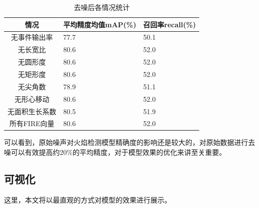 \begin{table}[ht]
    \centering
    \caption{去噪后各情况统计}
    \begin{tabularx}{0.7\textwidth}{c|X|X}
        \toprule
        情况&平均精度均值mAP(\%)&召回率recall(\%)\\
        \midrule
        无事件输出率&77.7&50.1\\
        无长宽比&80.6&52.0\\
        无圆形度&80.6&52.0\\
        无矩形度&80.6&52.0\\
        无尖角数&78.9&51.1\\
        无形心移动&80.6&52.0\\
        无面积生长系数&80.5&51.9\\
        所有FIRE向量&80.6&52.0\\
        \bottomrule
    \end{tabularx}
    \label{噪后}
\end{table}

可以看到，原始噪声对火焰检测模型精确度的影响还是较大的，对原始数据进行去噪可以有效提高约20\%的平均精度，对于模型效果的优化来讲至关重要。

\subsection{可视化}
这里，本文将以最直观的方式对模型的效果进行展示。

